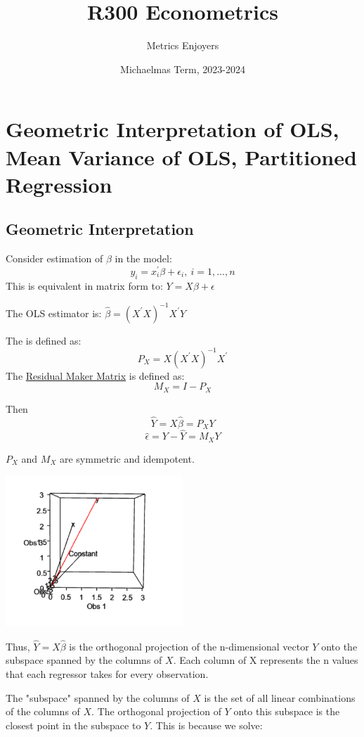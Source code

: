 \documentclass[DIV=14,titlepage=false]{scrreprt}
\title{%
R300 Econometrics}
\author{Metrics Enjoyers}
\date{Michaelmas Term, 2023-2024}
\begin{document}
\chapter{Geometric Interpretation of OLS, Mean Variance of OLS, Partitioned Regression}
\section{Geometric Interpretation}
Consider estimation of \(\beta\) in the model:
\[y_{i}=x^{'}_{i}\beta + \epsilon_{i}, \ i=1,...,n\]
This is equivalent in matrix form to: \(Y=X\beta+\epsilon\)

The OLS estimator is: \(\hat{\beta}=(X^{'}X)^{-1}X^{'}Y\)
\begin{definition}
  The \underline{} is defined as: \[P_X=X(X^{'}X)^{-1}X^{'}\]
  The \underline{Residual Maker Matrix} is defined as: \[M_X=I-P_X\]
\end{definition}

Then \[\hat{Y}=X\hat{\beta}=P_XY\] \[\hat{\epsilon}=Y-\hat{Y}=M_XY\]

\begin{claim}
  \(P_X\) and \(M_X\) are symmetric and idempotent.
\end{claim}

\begin{center}
  \includegraphics[width=0.5\textwidth]{OLS as projection.png}
\end{center}

Thus, \(\hat{Y}=X\hat{\beta}\) is the orthogonal projection of the n-dimensional vector \(Y\) onto the subspace spanned by the columns of \(X\).
Each column of X represents the n values that each regressor takes for every observation. 

The "subspace" spanned by the columns of \(X\) is the set of all linear combinations of the columns of \(X\). The orthogonal projection of \(Y\) onto this subspace is the closest point in the subspace to \(Y\). This is because we solve:
\end{document}
